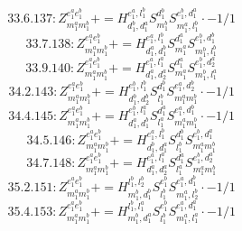 \documentclass[letterpaper,10pt,fleqn,leqno,onecolumn]{article}
\begin{document}
\begin{equation} \;\;\;\;\;\;  33.6.137: Z^{e_{1}^{a}e_{1}^{b}}_{m_{1}^{a}m_{1}^{b}}+=H^{e_{1}^{a},l_{1}^{b}}_{d_{1}^{b},d_{1}^{a}}S^{d_{1}^{b}}_{m_{1}^{b}}S^{e_{1}^{b},d_{1}^{a}}_{m_{1}^{a},l_{1}^{b}}\cdot -1/1 \end{equation}
\begin{equation} \;\;\;\;\;\;  33.7.138: Z^{e_{1}^{a}e_{1}^{b}}_{m_{1}^{a}m_{1}^{b}}+=H^{e_{1}^{a},l_{1}^{b}}_{d_{1}^{a},d_{1}^{b}}S^{d_{1}^{a}}_{m_{1}^{a}}S^{e_{1}^{b},d_{1}^{b}}_{m_{1}^{b},l_{1}^{b}} \end{equation}
\begin{equation} \;\;\;\;\;\;  33.9.140: Z^{e_{1}^{a}e_{1}^{b}}_{m_{1}^{a}m_{1}^{b}}+=H^{e_{1}^{a},l_{1}^{a}}_{d_{1}^{a},d_{2}^{a}}S^{d_{1}^{a}}_{m_{1}^{a}}S^{e_{1}^{b},d_{2}^{a}}_{m_{1}^{b},l_{1}^{a}} \end{equation}
\begin{equation} \;\;\;\;\;\;  34.2.143: Z^{e_{1}^{a}e_{1}^{b}}_{m_{1}^{a}m_{1}^{b}}+=H^{e_{1}^{b},l_{1}^{b}}_{d_{1}^{b},d_{2}^{b}}S^{d_{1}^{b}}_{l_{1}^{b}}S^{e_{1}^{a},d_{2}^{b}}_{m_{1}^{a}m_{1}^{b}}\cdot -1/1 \end{equation}
\begin{equation} \;\;\;\;\;\;  34.4.145: Z^{e_{1}^{a}e_{1}^{b}}_{m_{1}^{a}m_{1}^{b}}+=H^{e_{1}^{b},l_{1}^{a}}_{d_{1}^{a},d_{1}^{b}}S^{d_{1}^{a}}_{l_{1}^{a}}S^{e_{1}^{a},d_{1}^{b}}_{m_{1}^{a}m_{1}^{b}}\cdot -1/1 \end{equation}
\begin{equation} \;\;\;\;\;\;  34.5.146: Z^{e_{1}^{a}e_{1}^{b}}_{m_{1}^{a}m_{1}^{b}}+=H^{e_{1}^{a},l_{1}^{b}}_{d_{1}^{b},d_{1}^{a}}S^{d_{1}^{b}}_{l_{1}^{b}}S^{e_{1}^{b},d_{1}^{a}}_{m_{1}^{a}m_{1}^{b}} \end{equation}
\begin{equation} \;\;\;\;\;\;  34.7.148: Z^{e_{1}^{a}e_{1}^{b}}_{m_{1}^{a}m_{1}^{b}}+=H^{e_{1}^{a},l_{1}^{a}}_{d_{1}^{a},d_{2}^{a}}S^{d_{1}^{a}}_{l_{1}^{a}}S^{e_{1}^{b},d_{2}^{a}}_{m_{1}^{a}m_{1}^{b}} \end{equation}
\begin{equation} \;\;\;\;\;\;  35.2.151: Z^{e_{1}^{a}e_{1}^{b}}_{m_{1}^{a}m_{1}^{b}}+=H^{l_{1}^{b},l_{2}^{b}}_{m_{1}^{b},d_{1}^{b}}S^{e_{1}^{b}}_{l_{1}^{b}}S^{e_{1}^{a},d_{1}^{b}}_{m_{1}^{a},l_{2}^{b}}\cdot -1/1 \end{equation}
\begin{equation} \;\;\;\;\;\;  35.4.153: Z^{e_{1}^{a}e_{1}^{b}}_{m_{1}^{a}m_{1}^{b}}+=H^{l_{1}^{b},l_{1}^{a}}_{m_{1}^{b},d_{1}^{a}}S^{e_{1}^{b}}_{l_{1}^{b}}S^{e_{1}^{a},d_{1}^{a}}_{m_{1}^{a},l_{1}^{a}}\cdot -1/1 \end{equation}
\end{document}

